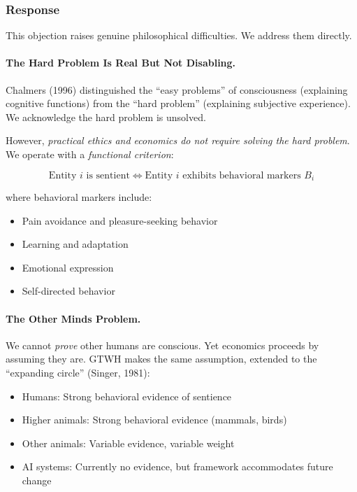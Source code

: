 \documentclass[12pt,a4paper]{article}
\begin{document}
\subsubsection{Response}

This objection raises genuine philosophical difficulties. We address them directly.

\paragraph{The Hard Problem Is Real But Not Disabling.}

Chalmers (1996) distinguished the ``easy problems'' of consciousness 
(explaining cognitive functions) from the ``hard problem'' (explaining 
subjective experience). We acknowledge the hard problem is unsolved.

However, \textit{practical ethics and economics do not require solving the 
hard problem}. We operate with a \textit{functional criterion}:

\begin{equation}
\text{Entity } i \text{ is sentient} \iff \text{Entity } i \text{ exhibits behavioral markers } B_i
\end{equation}

where behavioral markers include:
\begin{itemize}[nosep]
\item Pain avoidance and pleasure-seeking behavior
\item Learning and adaptation
\item Emotional expression
\item Self-directed behavior
\end{itemize}

\paragraph{The Other Minds Problem.}

We cannot \textit{prove} other humans are conscious. Yet economics proceeds 
by assuming they are. GTWH makes the same assumption, extended to the 
``expanding circle'' (Singer, 1981):
\begin{itemize}[nosep]
\item Humans: Strong behavioral evidence of sentience
\item Higher animals: Strong behavioral evidence (mammals, birds)
\item Other animals: Variable evidence, variable weight
\item AI systems: Currently no evidence, but framework accommodates future change
\end{itemize}
\end{document}
